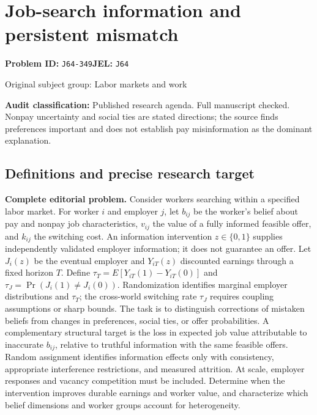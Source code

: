 \documentclass[11pt,a4paper]{article}
\begin{document}
\section*{Job-search information and persistent mismatch}
\textbf{Problem ID:} \texttt{J64-349}\quad \textbf{JEL:} \texttt{J64}\par
\label{problem:OP-0352}
\label{audited:ECON-095}
\label{audited:ECON-096}
{\sffamily\small\color{muted}Original subject group: Labor markets and work\par}
\label{definitions:problem:30007634}
\textbf{Audit classification:} Published research agenda. Full manuscript checked. Nonpay uncertainty and social ties are stated directions; the source finds preferences important and does not establish pay misinformation as the dominant explanation.
\subsection*{Definitions and precise research target}
\textbf{Complete editorial problem.} Consider workers searching within a specified labor market. For worker \(i\) and employer \(j\), let \(b_{ij}\) be the worker's belief about pay and nonpay job characteristics, \(v_{ij}\) the value of a fully informed feasible offer, and \(k_{ij}\) the switching cost. An information intervention \(z\in\{0,1\}\) supplies independently validated employer information; it does not guarantee an offer. Let \(J_i(z)\) be the eventual employer and \(Y_{iT}(z)\) discounted earnings through a fixed horizon \(T\). Define \(\tau_T=E[Y_{iT}(1)-Y_{iT}(0)]\) and \(\tau_J=\Pr(J_i(1)\ne J_i(0))\). Randomization identifies marginal employer distributions and \(\tau_T\); the cross-world switching rate \(\tau_J\) requires coupling assumptions or sharp bounds. The task is to distinguish corrections of mistaken beliefs from changes in preferences, social ties, or offer probabilities. A complementary structural target is the loss in expected job value attributable to inaccurate \(b_{ij}\), relative to truthful information with the same feasible offers. Random assignment identifies information effects only with consistency, appropriate interference restrictions, and measured attrition. At scale, employer responses and vacancy competition must be included. Determine when the intervention improves durable earnings and worker value, and characterize which belief dimensions and worker groups account for heterogeneity.
\end{document}
